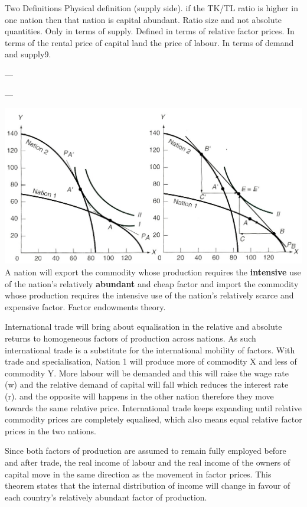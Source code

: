 \documentclass[12pt]{examnotes}
\begin{document}
\ra Two Definitions
 Physical definition (supply side). if the TK/TL ratio is higher in one nation then that nation is capital abundant. Ratio size and not absolute quantities. Only in terms of supply.
 Defined in terms of relative factor prices. In terms of the rental price of capital land the price of labour. In terms of demand and supply9.


\ra ---

\ra ---

\includegraphics[scale=0.4]{./imgs/54.jpg}
\ra A nation will export the commodity whose production requires the {\bf intensive} use of the nation's relatively {\bf abundant} and cheap factor and import the commodity whose production requires the intensive use of the nation's relatively scarce and expensive factor. 
\ra Factor endowments theory.

\ra International trade will bring about equalisation in the relative and absolute returns to homogeneous factors of production across nations. As such international trade is a substitute for the international mobility of factors. 
\ra With trade and specialisation, Nation 1 will produce more of commodity X and less of commodity Y. More labour will be demanded and this will raise the wage rate (w) and the relative demand of capital will fall which reduces the interest rate (r). and the opposite will happens in the other nation therefore they move towards the same relative price.
\ra International trade keeps expanding until relative commodity prices are completely equalised, which also means equal relative factor prices in the two nations.

\ra Since both factors of production are assumed to remain fully employed before and after trade, the real income of labour and the real income of the owners of capital move in the same direction as the movement in factor prices.
\ra This theorem states that the internal distribution of income will change in favour of each country's relatively abundant factor of production.
\end{document}
